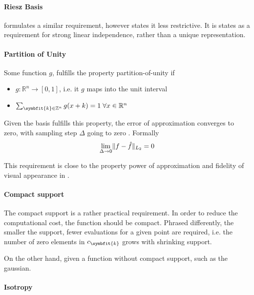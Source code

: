 \paragraph{Riesz Basis}

\cite{hanson_local_1985} formulates a similar requirement, however states it less restrictive. It is
states as a requirement for strong linear independence, rather than a unique representation.


\paragraph{Partition of Unity}

Some function \(g\), fulfills the property partition-of-unity if
\begin{itemize}
    \item \(g: \mathbb{R}^n \to [0, 1]\), i.e. it \(g\) maps into the unit interval
    \item \(\sum_{\symbfit{k} \in \mathbb{Z}^n} g(x + k) = 1 \; \forall x \in \mathbb{R}^n\)
\end{itemize}

Given the basis fulfills this property, the error of approximation converges to zero, with sampling
step \(\Delta\) going to zero \cite{nilchian_optimized_2015}. Formally
\[ \lim_{\Delta \to 0} \lVert f - \hat{f}\rVert_{L_2} = 0 \]


This requirement is close to the property power of approximation and fidelity of visual
appearance in \cite{hanson_local_1985}.

\paragraph{Compact support}

The compact support is a rather practical requirement. In order to reduce the computational cost,
the function should be compact. Phrased differently, the smaller the support, fewer evaluations for
a given point are required, i.e. the number of zero elements in \(c_{\symbfit{k}}\) grows with
shrinking support.

On the other hand, given a function without compact support, such as the gaussian.

\paragraph{Isotropy}

